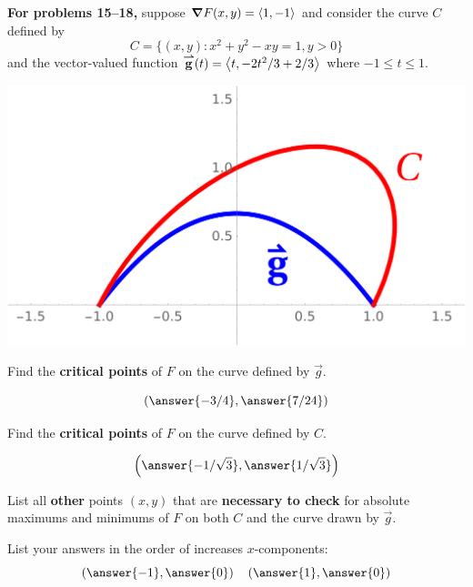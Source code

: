 \documentclass{ximera}
\author{Bart Snapp \and Darry Andrews}
\begin{document}

\textbf{For problems 15--18,} suppose $\boldsymbol\nabla F(x,y) = \left\langle 1,-1\right\rangle$
and consider the curve $C$ defined by
\[
C=\{(x,y): x^2+y^2-xy=1, y>0\}
\]
and the vector-valued function ${\overset{\boldsymbol{\rightharpoonup}}{\mathbf{g}}}(t) = \left\langle t,-2t^2/3+2/3\right\rangle$ where
$-1\le t \le 1$.
\begin{image}[3in]
  \includegraphics{optGraphics.png}
\end{image}





\begin{problem}
Find the \textbf{critical points} of $F$ on the curve defined by $\vec{g}$.
\begin{prompt}
  \[
  \left(\answer{-3/4}, \answer{7/24}\right)
  \]
\end{prompt}
\vfill
\end{problem}


\begin{problem}
Find the \textbf{critical points} of $F$ on the curve defined by $C$.
\begin{prompt}
  \[
  \left(\answer{-1/\sqrt{3}}, \answer{1/\sqrt{3}}\right)
  \]
\end{prompt}
\vfill
\end{problem}

\begin{problem}
  List all \textbf{other} points $(x,y)$ that are \textbf{necessary to
    check} for absolute maximums and minimums of $F$ on both $C$ and
  the curve drawn by $\vec{g}$.
  \begin{prompt}
    List your answers in the order of increases $x$-components:
    \[
    \left(\answer{-1},\answer{0}\right)\quad\left(\answer{1},\answer{0}\right)
    \]
  \end{prompt}
  \vfill
\end{problem}
\end{document}
